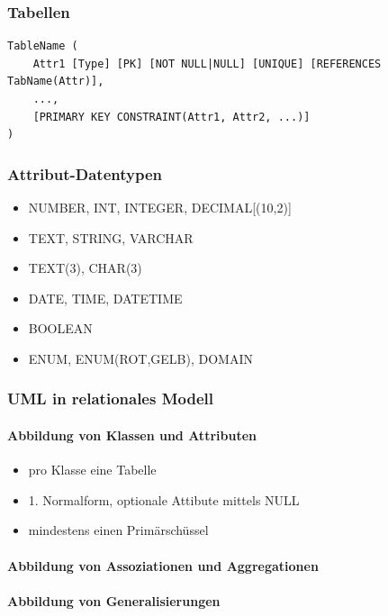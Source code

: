         \subsubsection{Tabellen}
            \begin{lstlisting}[style=SQL]
TableName (
    Attr1 [Type] [PK] [NOT NULL|NULL] [UNIQUE] [REFERENCES TabName(Attr)],
    ...,    
    [PRIMARY KEY CONSTRAINT(Attr1, Attr2, ...)]
)
            \end{lstlisting}
            \begin{multicols}{2}
            \subsubsection{Attribut-Datentypen}
                \begin{itemize}
                \setlength{\itemsep}{0pt}  
                  \item NUMBER, INT, INTEGER, DECIMAL[(10,2)]
                  \item TEXT, STRING, VARCHAR
                  \item TEXT(3), CHAR(3)
                  \item DATE, TIME, DATETIME
                  \item BOOLEAN
                  \item ENUM, ENUM(ROT,GELB), DOMAIN
                \end{itemize}
            \subsubsection{UML in relationales Modell}
                \paragraph{Abbildung von Klassen und Attributen}
                    \begin{itemize}
                    \setlength{\itemsep}{0pt}    
                        \item pro Klasse eine Tabelle
                        \item 1. Normalform, optionale Attibute mittels NULL
                        \item mindestens einen Primärschüssel
                    \end{itemize}
            \end{multicols}                    
                \paragraph{Abbildung von Assoziationen und Aggregationen}
                \paragraph{Abbildung von Generalisierungen}